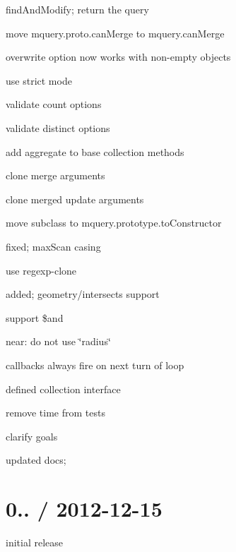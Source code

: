 \begin{DoxyItemize}
\item find\+And\+Modify; return the query
\item move mquery.\+proto.\+can\+Merge to mquery.\+can\+Merge
\item overwrite option now works with non-\/empty objects
\item use strict mode
\item validate count options
\item validate distinct options
\item add aggregate to base collection methods
\item clone merge arguments
\item clone merged update arguments
\item move subclass to mquery.\+prototype.\+to\+Constructor
\item fixed; max\+Scan casing
\item use regexp-\/clone
\item added; geometry/intersects support
\item support \$and
\item near\+: do not use \char`\"{}radius\char`\"{}
\item callbacks always fire on next turn of loop
\item defined collection interface
\item remove time from tests
\item clarify goals
\item updated docs;
\end{DoxyItemize}

\section*{0.. / 2012-\/12-\/15 }


\begin{DoxyItemize}
\item initial release 
\end{DoxyItemize}